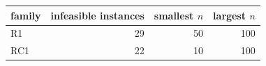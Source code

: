 \begin{tabular}{@{}lrrr@{}}
\toprule
family & infeasible instances & smallest $n$ & largest $n$ \\
\midrule
R1 & 29 & 50 & 100 \\
RC1 & 22 & 10 & 100 \\
\bottomrule
\end{tabular}
